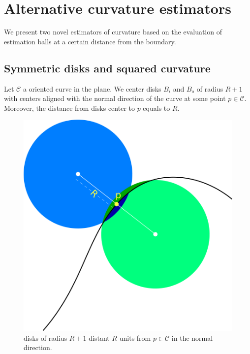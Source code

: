 \chapter{Alternative curvature estimators}\label{chapter:alternative-curvature-estimators}

We present two novel estimators of curvature based on the evaluation of estimation balls at a certain distance from the boundary. 

\section{Symmetric disks and squared curvature}

Let $\mathcal{C}$ a oriented curve in the plane. We center disks $B_i$ and $B_o$ of radius $R+1$ with centers aligned with the normal direction of the curve at some point $p \in \mathcal{C}$. Moreover, the distance from disks center to $p$ equals to $R$.

\begin{figure}[h!]\label{fig:r-separated-disks}
\center
\includegraphics[scale=0.35]{figures/chapter5/max-energy/r-separated-disks.png}
\caption{disks of radius $R+1$ distant $R$ units from $p\in \mathcal{C}$ in the normal direction.}
\end{figure}

